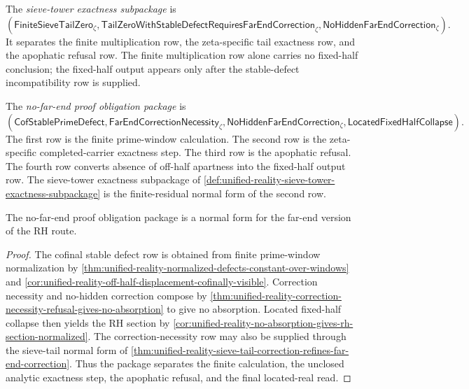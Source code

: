 \begin{definition}
\label{def:unified-reality-sieve-tower-exactness-subpackage}
The \emph{sieve-tower exactness subpackage} is
$$
(
\mathsf{FiniteSieveTailZero}_{\zeta},
\mathsf{TailZeroWithStableDefectRequiresFarEndCorrection}_{\zeta},
\mathsf{NoHiddenFarEndCorrection}_{\zeta}
).
$$
It separates the finite multiplication row, the zeta-specific tail
exactness row, and the apophatic refusal row.  The finite multiplication
row alone carries no fixed-half conclusion; the fixed-half output appears
only after the stable-defect incompatibility row is supplied.
\end{definition}

\begin{definition}
\label{def:unified-reality-no-far-end-proof-obligation-package}
The \emph{no-far-end proof obligation package} is
$$
(
\mathsf{CofStablePrimeDefect},
\mathsf{FarEndCorrectionNecessity}_{\zeta},
\mathsf{NoHiddenFarEndCorrection}_{\zeta},
\mathsf{LocatedFixedHalfCollapse}
).
$$
The first row is the finite prime-window calculation.  The second row is
the zeta-specific completed-carrier exactness step.  The third row is
the apophatic refusal.  The fourth row converts absence of off-half
apartness into the fixed-half output row.  The sieve-tower exactness
subpackage of
\autoref{def:unified-reality-sieve-tower-exactness-subpackage} is the
finite-residual normal form of the second row.
\end{definition}

\begin{theorem}
\label{thm:unified-reality-no-far-end-package-normal-form}
The no-far-end proof obligation package is a normal form for the
far-end version of the RH route.
\end{theorem}

\begin{proof}
The cofinal stable defect row is obtained from finite prime-window
normalization by
\autoref{thm:unified-reality-normalized-defects-constant-over-windows}
and
\autoref{cor:unified-reality-off-half-displacement-cofinally-visible}.
Correction necessity and no-hidden correction compose by
\autoref{thm:unified-reality-correction-necessity-refusal-gives-no-absorption}
to give no absorption.  Located fixed-half collapse then yields the RH
section by
\autoref{cor:unified-reality-no-absorption-gives-rh-section-normalized}.
The correction-necessity row may also be supplied through the sieve-tail
normal form of
\autoref{thm:unified-reality-sieve-tail-correction-refines-far-end-correction}.
Thus the package separates the finite calculation, the unclosed analytic
exactness step, the apophatic refusal, and the final located-real read.
\end{proof}

